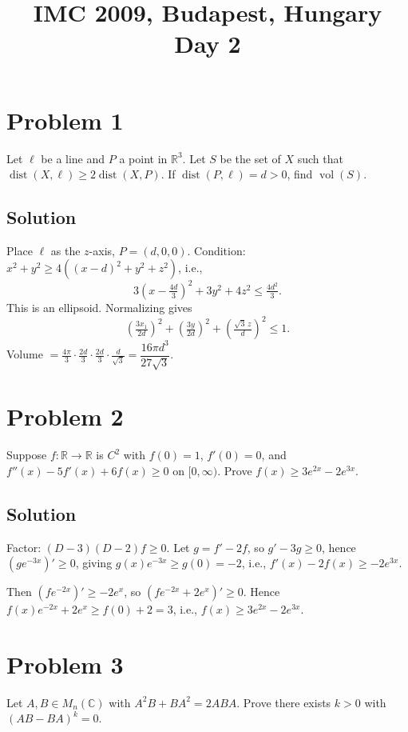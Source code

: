 \documentclass{article}
\title{IMC 2009, Budapest, Hungary \\ Day 2}
\date{}
\begin{document}
\maketitle

\section*{Problem 1}
Let $\ell$ be a line and $P$ a point in $\mathbb{R}^3$. Let $S$ be the set of $X$ such that $\operatorname{dist}(X, \ell) \ge 2 \operatorname{dist}(X, P)$. If $\operatorname{dist}(P, \ell) = d > 0$, find $\operatorname{vol}(S)$.

\subsection*{Solution}
Place $\ell$ as the $z$-axis, $P = (d, 0, 0)$. Condition: $x^2 + y^2 \ge 4((x-d)^2 + y^2 + z^2)$, i.e.,
\[
3\left(x - \tfrac{4d}{3}\right)^2 + 3 y^2 + 4 z^2 \le \tfrac{4 d^2}{3}.
\]
This is an ellipsoid. Normalizing gives
\[
\left(\tfrac{3 x_1}{2d}\right)^2 + \left(\tfrac{3 y}{2d}\right)^2 + \left(\tfrac{\sqrt 3 \, z}{d}\right)^2 \le 1.
\]
Volume $= \tfrac{4\pi}{3} \cdot \tfrac{2d}{3} \cdot \tfrac{2d}{3} \cdot \tfrac{d}{\sqrt 3} = \boxed{\dfrac{16 \pi d^3}{27 \sqrt 3}}$.

\section*{Problem 2}
Suppose $f : \mathbb{R} \to \mathbb{R}$ is $C^2$ with $f(0) = 1$, $f'(0) = 0$, and $f''(x) - 5 f'(x) + 6 f(x) \ge 0$ on $[0, \infty)$. Prove $f(x) \ge 3 e^{2x} - 2 e^{3x}$.

\subsection*{Solution}
Factor: $(D - 3)(D - 2) f \ge 0$. Let $g = f' - 2f$, so $g' - 3g \ge 0$, hence $(g e^{-3x})' \ge 0$, giving $g(x) e^{-3x} \ge g(0) = -2$, i.e., $f'(x) - 2 f(x) \ge -2 e^{3x}$.

Then $(f e^{-2x})' \ge -2 e^x$, so $(f e^{-2x} + 2 e^x)' \ge 0$. Hence $f(x) e^{-2x} + 2 e^x \ge f(0) + 2 = 3$, i.e., $f(x) \ge 3 e^{2x} - 2 e^{3x}$.

\section*{Problem 3}
Let $A, B \in M_n(\mathbb{C})$ with $A^2 B + B A^2 = 2 ABA$. Prove there exists $k > 0$ with $(AB - BA)^k = 0$.
\end{document}
